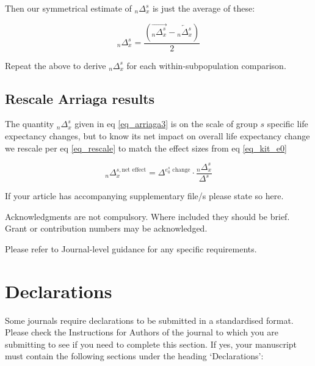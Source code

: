 \documentclass[sn-apa,pdflatex]{sn-jnl}
\theoremstyle{remark}
\theoremstyle{definition}
\begin{document}
Then our symmetrical estimate of \({}_n\Delta_x^s\) is just the average
of these:

\begin{equation}
\label{eq_arriaga3}
{}_n\Delta_x^s = \frac{\left(\overrightarrow{{}_n\Delta_x^s} -  \overleftarrow{{}_n\Delta_x^s}\right)}{2}
\end{equation}

Repeat the above to derive \({}_n\Delta_x^s\) for each
within-subpopulation comparison.

\hypertarget{rescale-arriaga-results}{%
\subsection{Rescale Arriaga results}\label{rescale-arriaga-results}}

The quantity \({}_n\Delta_x^s\) given in eq \eqref{eq_arriaga3} is on
the scale of group \(s\) specific life expectancy changes, but to know
its net impact on overall life expectancy change we rescale per eq
\eqref{eq_rescale} to match the effect sizes from eq \eqref{eq_kit_e0}

\begin{equation}
\label{eq_rescale}
{}_n\Delta_x^{s,\text{net effect}} = \Delta^{e_0^s\text{~change}} \cdot \frac{{}_n\Delta_x^s}{\Delta^s}
\end{equation}

\backmatter


If your article has accompanying supplementary file/s please state so
here.


Acknowledgments are not compulsory. Where included they should be brief.
Grant or contribution numbers may be acknowledged.

Please refer to Journal-level guidance for any specific requirements.

\hypertarget{declarations}{%
\section*{Declarations}\label{declarations}}

Some journals require declarations to be submitted in a standardised
format. Please check the Instructions for Authors of the journal to
which you are submitting to see if you need to complete this section. If
yes, your manuscript must contain the following sections under the
heading `Declarations':
\end{document}
